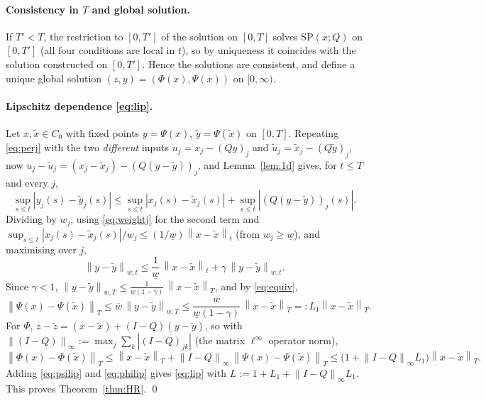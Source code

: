 \documentclass{amsart}
\theoremstyle{definition}
\theoremstyle{remark}
\newcommand{\norm}[1]{\left\lVert#1\right\rVert}
\begin{document}
\paragraph{Consistency in $T$ and global solution.}
If $T'<T$, the restriction to $[0,T']$ of the solution on $[0,T]$ solves
$\mathrm{SP}(x;Q)$ on $[0,T']$ (all four conditions are local in $t$), so by
uniqueness it coincides with the solution constructed on $[0,T']$. Hence the
solutions are consistent, and define a unique global solution
$(z,y)=(\Phi(x),\Psi(x))$ on $[0,\infty)$.

\paragraph{Lipschitz dependence \eqref{eq:lip}.}
Let $x,\tilde x\in C_0$ with fixed points $y=\Psi(x)$,
$\tilde y=\Psi(\tilde x)$ on $[0,T]$. Repeating \eqref{eq:perj} with the two
\emph{different} inputs $u_j=x_j-(Qy)_j$ and $\tilde u_j=\tilde
x_j-(Q\tilde y)_j$, now $u_j-\tilde u_j=(x_j-\tilde x_j)-(Q(y-\tilde y))_j$, and
Lemma~\ref{lem:1d} gives, for $t\le T$ and every $j$,
\[
  \sup_{s\le t}|y_j(s)-\tilde y_j(s)|
  \le \sup_{s\le t}|x_j(s)-\tilde x_j(s)|+\sup_{s\le t}|(Q(y-\tilde y))_j(s)|.
\]
Dividing by $w_j$, using \eqref{eq:weightj} for the second term and
$\sup_{s\le t}|x_j(s)-\tilde x_j(s)|/w_j\le (1/\underline w)\norm{x-\tilde x}_t$
(from $w_j\ge\underline w$), and maximising over $j$,
\[
  \norm{y-\tilde y}_{w,t}\le \frac1{\underline w}\,\norm{x-\tilde x}_{t}
  +\gamma\,\norm{y-\tilde y}_{w,t}.
\]
Since $\gamma<1$, $\norm{y-\tilde y}_{w,T}\le
\frac{1}{\underline w(1-\gamma)}\,\norm{x-\tilde x}_{T}$, and by
\eqref{eq:equiv},
\begin{equation}\label{eq:psilip}
  \norm{\Psi(x)-\Psi(\tilde x)}_T\le \overline w\,\norm{y-\tilde y}_{w,T}
  \le \frac{\overline w}{\underline w(1-\gamma)}\,\norm{x-\tilde x}_T=:L_1\norm{x-\tilde x}_T .
\end{equation}
For $\Phi$, $z-\tilde z=(x-\tilde x)+(I-Q)(y-\tilde y)$, so with
$\norm{(I-Q)}_\infty:=\max_j\sum_k|(I-Q)_{jk}|$ (the matrix $\ell^\infty$
operator norm),
\begin{equation}\label{eq:philip}
  \norm{\Phi(x)-\Phi(\tilde x)}_T\le\norm{x-\tilde x}_T
  +\norm{I-Q}_\infty\,\norm{\Psi(x)-\Psi(\tilde x)}_T
  \le\big(1+\norm{I-Q}_\infty L_1\big)\norm{x-\tilde x}_T .
\end{equation}
Adding \eqref{eq:psilip} and \eqref{eq:philip} gives \eqref{eq:lip} with
$L:=1+L_1+\norm{I-Q}_\infty L_1$. This proves Theorem~\ref{thm:HR}.
\qed
\end{document}
